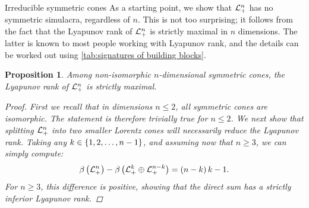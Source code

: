 \documentclass{interact}
\theoremstyle{plain}
\newtheorem{proposition}[theorem]{Proposition}
\theoremstyle{definition}
\theoremstyle{remark}
\begin{document}
  \begin{section}{Irreducible symmetric cones}\label{sec:irreducible cones}
    As a starting point, we show that $\Lnplus$ has no symmetric
    simulacra, regardless of $n$. This is not too surprising; it
    follows from the fact that the Lyapunov rank of $\Lnplus$ is
    strictly maximal in $n$ dimensions. The latter is known to most
    people working with Lyapunov rank, and the details can be worked
    out using \cref{tab:signatures of building blocks}.

    \begin{proposition}\label{prop:rank of lorentz is maximal}
      Among non-isomorphic $n$-dimensional symmetric cones, the
      Lyapunov rank of $\Lnplus$ is strictly maximal.
      \begin{proof}
        First we recall that in dimensions $n \le 2$, all symmetric
        cones are isomorphic. The statement is therefore trivially
        true for $n \le 2$. We next show that splitting $\Lnplus$ into
        two smaller Lorentz cones will necessarily reduce the Lyapunov
        rank. Taking any $k \in \set{1,2,\ldots,n-1}$, and assuming
        now that $n \ge 3$, we can simply compute:
        \begin{equation*}
          \lyapunovrank{\Lnplus}
          -
          \lyapunovrank{\directsum{\Lnplus[k]}{\Lnplus[n-k]} }
          =
          \qty{n-k}{k} - 1.
        \end{equation*}
        For $n \ge 3$, this difference is positive, showing that the
        direct sum has a strictly inferior Lyapunov rank.


\end{proof}
\end{proposition}
\end{section}
\end{document}
